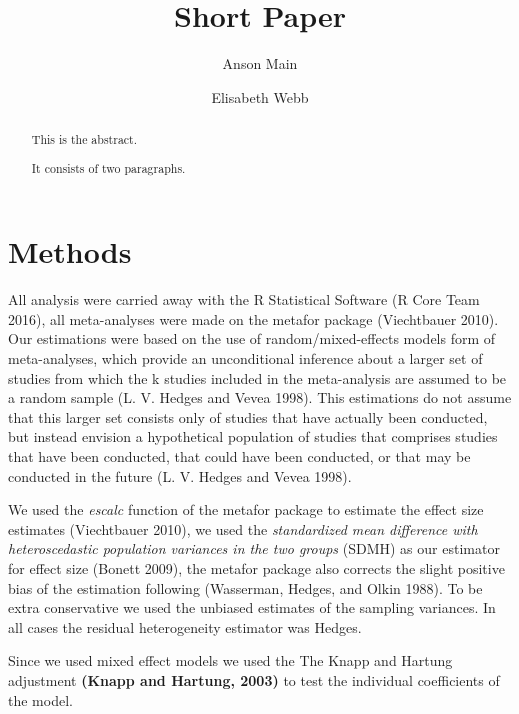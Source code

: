 \documentclass[]{elsarticle} %
\begin{document}
\begin{frontmatter}

  \title{Short Paper}
    \author[School of Natural Resources]{Anson Main}
    \author[School of Natural Resources]{Elisabeth Webb}
  
      \address[Some Institute of Technology]{Department, Street, City, State, Zip}
    \address[Another University]{Department, Street, City, State, Zip}
  
  \begin{abstract}
  This is the abstract.
  
  It consists of two paragraphs.
  \end{abstract}
  
 \end{frontmatter}

\section{Methods}\label{methods}

All analysis were carried away with the R Statistical Software (R Core
Team 2016), all meta-analyses were made on the metafor package
(Viechtbauer 2010). Our estimations were based on the use of
random/mixed-effects models form of meta-analyses, which provide an
unconditional inference about a larger set of studies from which the k
studies included in the meta-analysis are assumed to be a random sample
(L. V. Hedges and Vevea 1998). This estimations do not assume that this
larger set consists only of studies that have actually been conducted,
but instead envision a hypothetical population of studies that comprises
studies that have been conducted, that could have been conducted, or
that may be conducted in the future (L. V. Hedges and Vevea 1998).

We used the \emph{escalc} function of the metafor package to estimate
the effect size estimates (Viechtbauer 2010), we used the
\emph{standardized mean difference with heteroscedastic population
variances in the two groups} (SDMH) as our estimator for effect size
(Bonett 2009), the metafor package also corrects the slight positive
bias of the estimation following (Wasserman, Hedges, and Olkin 1988). To
be extra conservative we used the unbiased estimates of the sampling
variances. In all cases the residual heterogeneity estimator was Hedges.

Since we used mixed effect models we used the The Knapp and Hartung
adjustment \textbf{(Knapp and Hartung, 2003)} to test the individual
coefficients of the model.
\end{document}
